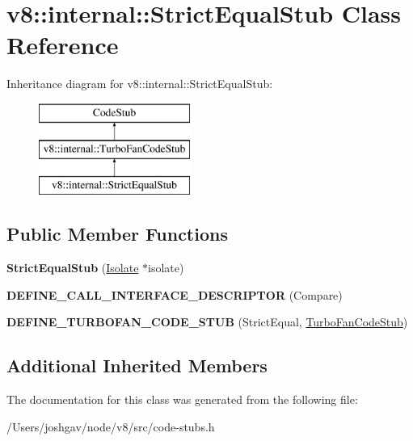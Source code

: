 \hypertarget{classv8_1_1internal_1_1_strict_equal_stub}{}\section{v8\+:\+:internal\+:\+:Strict\+Equal\+Stub Class Reference}
\label{classv8_1_1internal_1_1_strict_equal_stub}
Inheritance diagram for v8\+:\+:internal\+:\+:Strict\+Equal\+Stub\+:\begin{figure}[H]
\begin{center}
\leavevmode
\includegraphics[height=3.000000cm]{classv8_1_1internal_1_1_strict_equal_stub}
\end{center}
\end{figure}
\subsection*{Public Member Functions}
\begin{DoxyCompactItemize}
\item 
{\bfseries Strict\+Equal\+Stub} (\hyperlink{classv8_1_1internal_1_1_isolate}{Isolate} $\ast$isolate)\hypertarget{classv8_1_1internal_1_1_strict_equal_stub_a80c9568eb464b8cdf1be4368fc02d524}{}\label{classv8_1_1internal_1_1_strict_equal_stub_a80c9568eb464b8cdf1be4368fc02d524}

\item 
{\bfseries D\+E\+F\+I\+N\+E\+\_\+\+C\+A\+L\+L\+\_\+\+I\+N\+T\+E\+R\+F\+A\+C\+E\+\_\+\+D\+E\+S\+C\+R\+I\+P\+T\+OR} (Compare)\hypertarget{classv8_1_1internal_1_1_strict_equal_stub_a80033c951309856aadb308d58ffd7389}{}\label{classv8_1_1internal_1_1_strict_equal_stub_a80033c951309856aadb308d58ffd7389}

\item 
{\bfseries D\+E\+F\+I\+N\+E\+\_\+\+T\+U\+R\+B\+O\+F\+A\+N\+\_\+\+C\+O\+D\+E\+\_\+\+S\+T\+UB} (Strict\+Equal, \hyperlink{classv8_1_1internal_1_1_turbo_fan_code_stub}{Turbo\+Fan\+Code\+Stub})\hypertarget{classv8_1_1internal_1_1_strict_equal_stub_a537e51bc2c0704e7e0e9b1c165c4b30a}{}\label{classv8_1_1internal_1_1_strict_equal_stub_a537e51bc2c0704e7e0e9b1c165c4b30a}

\end{DoxyCompactItemize}
\subsection*{Additional Inherited Members}


The documentation for this class was generated from the following file\+:\begin{DoxyCompactItemize}
\item 
/\+Users/joshgav/node/v8/src/code-\/stubs.\+h\end{DoxyCompactItemize}

